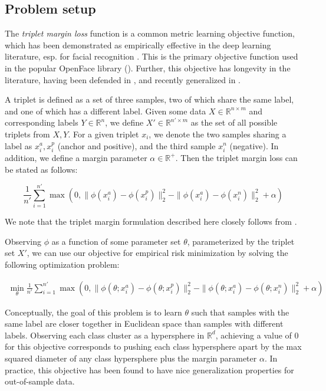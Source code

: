 \documentclass[11pt]{article}
\begin{document}
\subsection{Problem setup}

The \textit{triplet margin loss} function is a common metric learning objective function, which has been demonstrated as empirically effective in the deep learning literature, esp. for facial recognition \cite{schroff_facenet_2015}. This is the primary objective function used in the popular OpenFace library (\cite{amos_openface_2016}). Further, this objective has longevity in the literature, having been defended in \cite{hermans_defense_2017}, and recently generalized in \cite{qian_softtriple_2019}.

A triplet is defined as a set of three samples, two of which share the same label, and one of which has a different label. Given some data $X \in \mathbb{R}^{n \times m}$ and corresponding labels $Y \in \mathbb{R}^n$, we define $X' \in \mathbb{R}^{n' \times m}$ as the set of all possible triplets from $X, Y$. For a given triplet $x_i$, we denote the two samples sharing a label as $x_i^a, x_i^p$ (anchor and positive), and the third sample $x_i^n$ (negative). In addition, we define a margin parameter $\alpha \in \mathbb{R}^+$. Then the triplet margin loss can be stated as follows:

\begin{equation}
    \frac{1}{n'} \sum_{i=1}^{n'} \max(0, \| \phi(x_i^a) - \phi(x_i^p)\|_2^2 - \| \phi(x_i^a) - \phi(x_i^n)\|_2^2 + \alpha)
\end{equation}

We note that the triplet margin formulation described here closely follows from \cite{schroff_facenet_2015}.

Observing $\phi$ as a function of some parameter set $\theta$, parameterized by the triplet set $X'$, we can use our objective for empirical risk minimization by solving the following optimization problem:

\begin{equation}
\label{eq:triplet_objective}
\begin{aligned}
    \min_{\theta} \frac{1}{n'} \sum_{i=1}^{n'} \max(0, \| \phi(\theta; x_i^a) - \phi(\theta; x_i^p)\|_2^2 - \| \phi(\theta; x_i^a) - \phi(\theta; x_i^n)\|_2^2 + \alpha)
\end{aligned}
\end{equation}

Conceptually, the goal of this problem is to learn $\theta$ such that samples with the same label are closer together in Euclidean space than samples with different labels. Observing each class cluster as a hypersphere in $\mathbb{R}^d$, achieving a value of $0$ for this objective corresponds to pushing each class hypersphere apart by the max squared diameter of any class hypersphere plus the margin parameter $\alpha$. In practice, this objective has been found to have nice generalization properties for out-of-sample data.
\end{document}
